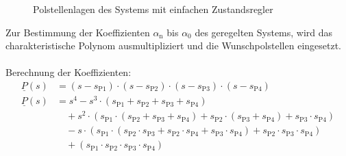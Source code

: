 \documentclass[
	pagesize,
	fontsize=12pt,
	paper=a4,
	oneside,
   reqno
]{scrartcl}
\begin{document}
\begin{figure}[H]
    \centering
    \caption[Polstellenlage Ackermann]{Polstellenlagen des Systems mit einfachen Zustandsregler}
    \label{fig:Bild8}
\end{figure}
Zur Bestimmung der Koeffizienten $\alpha_{\mathrm{n}}$ bis $\alpha_{\mathrm{0}}$ des geregelten Systems, wird das charakteristische Polynom ausmultipliziert und die Wunschpolstellen eingesetzt.\\\\
Berechnung der Koeffizienten:
\begin{align*}
    \underline{P}(s) &= (s-s_{\mathrm{P1}})\cdot(s-s_{\mathrm{P2}})\cdot(s-s_{\mathrm{P3}})\cdot(s-s_{\mathrm{P4}}) \\
    \underline{P}(s) &= s^4-s^3\cdot(s_{\mathrm{P1}}+s_{\mathrm{P2}}+s_{\mathrm{P3}}+s_{\mathrm{P4}}) \nonumber \\ 
    &\quad +s^2\cdot(s_{\mathrm{P1}}\cdot(s_{\mathrm{P2}}+s_{\mathrm{P3}}+s_{\mathrm{P4}})+s_{\mathrm{P2}}\cdot(s_{\mathrm{P3}}+s_{\mathrm{P4}})+s_{\mathrm{P3}}\cdot s_{\mathrm{P4}}) \nonumber \\
    &\quad -s\cdot(s_{\mathrm{P1}}\cdot(s_{\mathrm{P2}}\cdot s_{\mathrm{P3}}+s_{\mathrm{P2}}\cdot s_{\mathrm{P4}}+s_{\mathrm{P3}}\cdot s_{\mathrm{P4}})+s_{\mathrm{P2}}\cdot s_{\mathrm{P3}}\cdot s_{\mathrm{P4}}) \nonumber \\
    &\quad +(s_{\mathrm{P1}}\cdot s_{\mathrm{P2}}\cdot s_{\mathrm{P3}}\cdot s_{\mathrm{P4}})
\end{align*}\\
\end{document}
